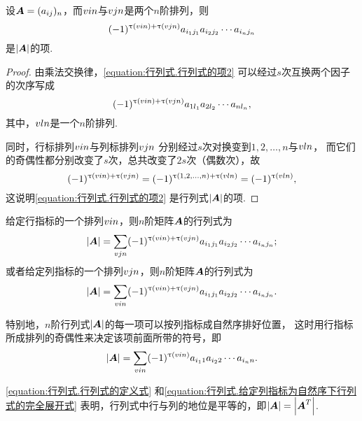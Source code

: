 \begin{lemma}
设\(\boldsymbol{A}=(a_{ij})_n\)，而\(v{i}{n}\)与\(v{j}{n}\)是两个\(n\)阶排列，则
\begin{equation}\label{equation:行列式.行列式的项2}
	(-1)^{\uptau(v{i}{n})+\uptau(v{j}{n})}
	a_{i_1j_1} a_{i_2j_2} \dotsm a_{i_nj_n}
\end{equation}
是\(\abs{\boldsymbol{A}}\)的项.
\begin{proof}
由乘法交换律，\cref{equation:行列式.行列式的项2} 可以经过\(s\)次互换两个因子的次序写成\[
(-1)^{\uptau(v{i}{n})+\uptau(v{j}{n})}
	a_{1 l_1} a_{2 l_2} \dotsm a_{n l_n},
\]其中，\(v{l}{n}\)是一个\(n\)阶排列.

同时，行标排列\(v{i}{n}\)与列标排列\(v{j}{n}\)
分别经过\(s\)次对换变到\(1,2,\dotsc,n\)与\(v{l}{n}\)，
而它们的奇偶性都分别改变了\(s\)次，总共改变了\(2s\)次（偶数次），故\[
	(-1)^{\uptau(v{i}{n})+\uptau(v{j}{n})}
	= (-1)^{\uptau(1,2,\dotsc,n)+\uptau(v{l}{n})}
	= (-1)^{\uptau(v{l}{n})},
\]这说明\cref{equation:行列式.行列式的项2} 是行列式\(\abs{\boldsymbol{A}}\)的项.
\end{proof}
\end{lemma}

\begin{corollary}
给定行指标的一个排列\(v{i}{n}\)，则\(n\)阶矩阵\(\boldsymbol{A}\)的行列式为
\begin{equation}\label{equation:行列式.给定行指标排列下的行列式的完全展开式}
\abs{\boldsymbol{A}}
= \sum\limits_{v{j}{n}}
(-1)^{\uptau(v{i}{n})+\uptau(v{j}{n})}
a_{i_1 j_1} a_{i_2 j_2} \dotsm a_{i_n j_n};
\end{equation}
或者给定列指标的一个排列\(v{j}{n}\)，则\(n\)阶矩阵\(\boldsymbol{A}\)的行列式为
\begin{equation}\label{equation:行列式.给定列指标排列下的行列式的完全展开式}
	\abs{\boldsymbol{A}}
	= \sum\limits_{v{i}{n}}
	(-1)^{\uptau(v{i}{n})+\uptau(v{j}{n})}
	a_{i_1 j_1} a_{i_2 j_2} \dotsm a_{i_n j_n}.
\end{equation}

特别地，\(n\)阶行列式\(\abs{\boldsymbol{A}}\)的每一项可以按列指标成自然序排好位置，
这时用行指标所成排列的奇偶性来决定该项前面所带的符号，即
\begin{equation}\label{equation:行列式.给定列指标为自然序下行列式的完全展开式}
	\abs{\boldsymbol{A}} =
	\sum\limits_{v{i}{n}}
	(-1)^{\uptau(v{i}{n})}
	a_{i_1 1} a_{i_2 2} \dotsm a_{i_n n}.
\end{equation}
\end{corollary}
\cref{equation:行列式.行列式的定义式} 和\cref{equation:行列式.给定列指标为自然序下行列式的完全展开式}
表明，行列式中行与列的地位是平等的，即\(\abs{\boldsymbol{A}} = \abs{\boldsymbol{A}^T}\).

